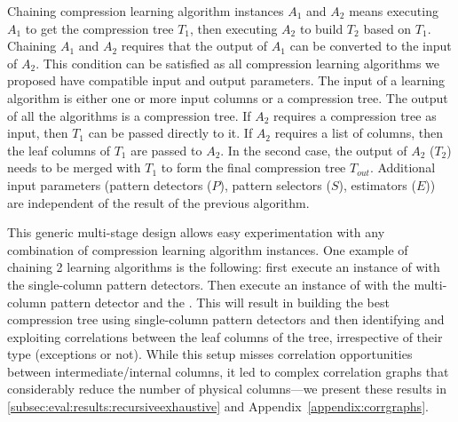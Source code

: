 Chaining compression learning algorithm instances \(A_{1}\) and \(A_{2}\) means executing \(A_{1}\) to get the compression tree \(T_{1}\), then executing \(A_{2}\) to build \(T_{2}\) based on \(T_{1}\). Chaining \(A_{1}\) and \(A_{2}\) requires that the output of \(A_{1}\) can be converted to the input of \(A_{2}\). This condition can be satisfied as all compression learning algorithms we proposed have compatible input and output parameters. The input of a learning algorithm is either one or more input columns or a compression tree. The output of all the algorithms is a compression tree. If \(A_{2}\) requires a compression tree as input, then \(T_{1}\) can be passed directly to it. If \(A_{2}\) requires a list of columns, then the leaf columns of \(T_{1}\) are passed to \(A_{2}\). In the second case, the output of \(A_{2}\) (\(T_{2}\)) needs to be merged with \(T_{1}\) to form the final compression tree \(T_{out}\). Additional input parameters (pattern detectors (\(P\)), pattern selectors (\(S\)), estimators (\(E\))) are independent of the result of the previous algorithm.

This generic multi-stage design allows easy experimentation with any combination of compression learning algorithm instances. One example of chaining 2 learning algorithms is the following: first execute an instance of  with the single-column pattern detectors. Then execute an instance of  with the multi-column pattern detector  and the . This will result in building the best compression tree using single-column pattern detectors and then identifying and exploiting correlations between the leaf columns of the tree, irrespective of their type (exceptions or not). While this setup misses correlation opportunities between intermediate/internal columns, it led to complex correlation graphs that considerably reduce the number of physical columns---we present these results in \ref{subsec:eval:results:recursiveexhaustive} and Appendix~\ref{appendix:corrgraphs}.



